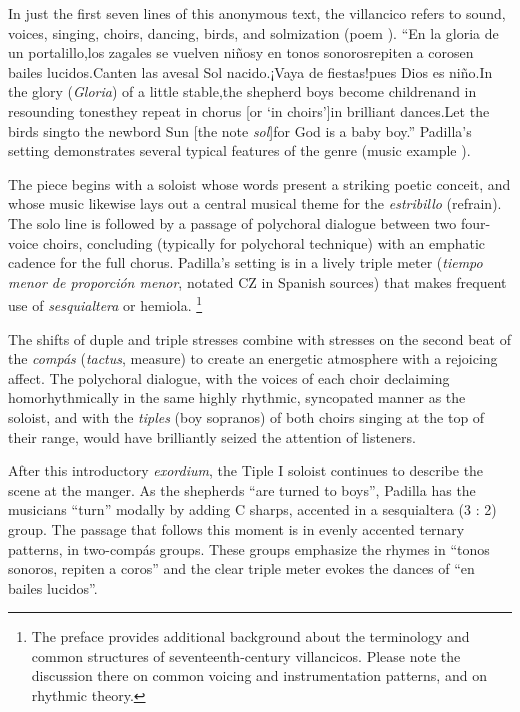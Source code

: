 \documentclass[oneside,12pt]{book}
\begin{document}
      In just the first seven lines of this anonymous text, the villancico refers to sound, voices, singing, choirs, dancing, birds, and solmization (poem \autocite{poem:En_la_gloria_de_un_portalillo}).
    \enquote{En la gloria de un portalillo,los zagales se vuelven niñosy en tonos sonorosrepiten a corosen bailes lucidos.Canten las avesal Sol nacido.¡Vaya de fiestas!pues Dios es niño.In the glory (\emph{Gloria}) of a little stable,the shepherd boys become childrenand in resounding tonesthey repeat in chorus [or \enquote{in choirs}]in brilliant dances.Let the birds singto the newbord Sun [the note \emph{sol}]for God is a baby boy.}
      Padilla’s setting demonstrates several typical features of the genre (music example \autocite{music:Padilla-En_la_gloria_de_un_portalillo}).
      
      The piece begins with a soloist whose words present a striking poetic conceit, and whose music likewise lays out a central musical theme for the \emph{estribillo} (refrain).
      The solo line is followed by a passage of polychoral dialogue between two four-voice choirs, concluding (typically for polychoral technique) with an emphatic cadence for the full chorus.
      Padilla’s setting is in a lively triple meter (\emph{tiempo menor de proporción menor}, notated CZ in Spanish sources) that makes frequent use of \emph{sesquialtera} or hemiola.%
\footnote{
	The preface provides additional background about the terminology and common structures of seventeenth-century villancicos.
	Please note the discussion there on common voicing and instrumentation patterns, and on rhythmic theory.
      }
      
      The shifts of duple and triple stresses combine with stresses on the second beat of the \emph{compás} (\emph{tactus}, measure) to create an energetic atmosphere with a rejoicing affect.
      The polychoral dialogue, with the voices of each choir declaiming homorhythmically in the same highly rhythmic, syncopated manner as the soloist, and with the \emph{tiples} (boy sopranos) of both choirs singing at the top of their range, would have brilliantly seized the attention of listeners.
    
      After this introductory \emph{exordium}, the Tiple I soloist continues to describe the scene at the manger.
      As the shepherds \enquote{are turned to boys}, Padilla has the musicians \enquote{turn} modally by adding C sharps, accented in a sesquialtera (3 : 2) group.
      The passage that follows this moment is in evenly accented ternary patterns, in two-compás groups.
      These groups emphasize the rhymes in \enquote{tonos sonoros, repiten a coros} and the clear triple meter evokes the dances of \enquote{en bailes lucidos}.
    
\end{document}
